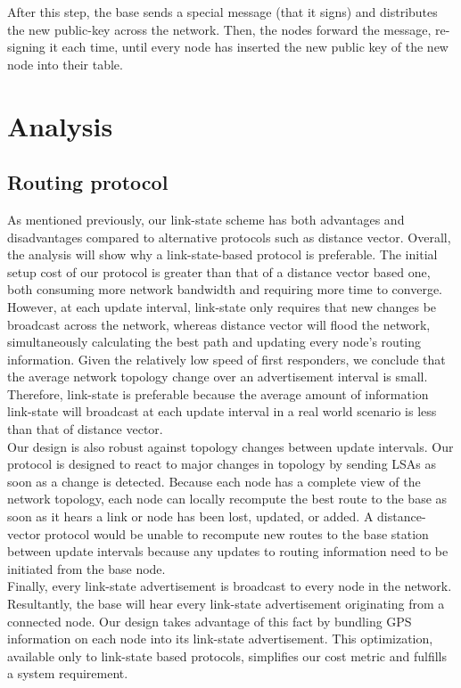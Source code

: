 \documentclass[letterpaper]{article}
\begin{document}
\noindent After this step, the base sends a special message (that it signs) and distributes the new public-key across the network. 
Then, the nodes forward the message, re-signing it each time, until every node has inserted the new public key of the new node into their table.

\section{Analysis}

\subsection{Routing protocol}

As mentioned previously, our link-state scheme has both advantages and disadvantages compared to alternative protocols
such as distance vector. Overall, the analysis will show why a link-state-based protocol is preferable. The initial
setup cost of our protocol is greater than that of a distance vector based one, both consuming more network bandwidth
and requiring more time to converge. However, at each update interval, link-state only requires that new changes
be broadcast across the network, whereas distance vector will flood the network, simultaneously calculating the 
best path and updating every node's routing information. Given the relatively low speed of first responders, we 
conclude that the average network topology change over an advertisement interval is small. Therefore, link-state is
preferable because the average amount of information link-state will broadcast at each update interval in a real world
scenario is less than that of distance vector.
\\

\noindent Our design is also robust against topology changes between update intervals. Our protocol is designed to react
to major changes in topology by sending LSAs as soon as a change is detected. Because each node has a complete view of 
the network topology, each node can locally recompute the best route to the base as soon as it hears a link or node has 
been lost, updated, or added. A distance-vector protocol would be unable to recompute new routes to the base station
between update intervals because any updates to routing information need to be initiated from the base node.
\\

\noindent Finally, every link-state advertisement is broadcast to every node in the network. Resultantly, the base
will hear every link-state advertisement originating from a connected node. Our design takes advantage of this fact by
bundling GPS information on each node into its link-state advertisement. This optimization, available only to link-state
based protocols, simplifies our cost metric and fulfills a system requirement. 
\end{document}
